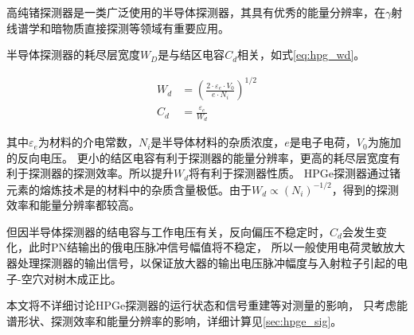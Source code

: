 高纯锗探测器是一类广泛使用的半导体探测器，其具有优秀的能量分辨率，在$\gamma$射线谱学和暗物质直接探测等领域有重要应用。

半导体探测器的耗尽层宽度$W_D$是与结区电容$C_d$相关，如式\ref{eq:hpg_wd}。

\begin{align}
    \label{eq:hpg_wd}
    W_d &= \left(\frac{2\cdot \varepsilon_e\cdot V_0}{e\cdot N_i}\right)^{1/2} \\
    C_d &= \frac{\varepsilon_e}{W_d}
\end{align}

其中$\varepsilon_e$为材料的介电常数，$N_i$是半导体材料的杂质浓度，$e$是电子电荷，$V_0$为施加的反向电压。
更小的结区电容有利于探测器的能量分辨率，更高的耗尽层宽度有利于探测器的探测效率。所以提升$W_d$将有利于探测器性质。
HPGe探测器通过锗元素的熔炼技术是的材料中的杂质含量极低。由于$W_d\propto (N_i)^{-1/2}$，得到的探测效率和能量分辨率都较高。

但因半导体探测器的结电容与工作电压有关，反向偏压不稳定时，$C_d$会发生变化，此时PN结输出的俄电压脉冲信号幅值将不稳定，
所以一般使用电荷灵敏放大器处理探测器的输出信号，以保证放大器的输出电压脉冲幅度与入射粒子引起的电子-空穴对树木成正比。

本文将不详细讨论HPGe探测器的运行状态和信号重建等对测量的影响，
只考虑能谱形状、探测效率和能量分辨率的影响，详细计算见\ref{sec:hpge_sig}。
